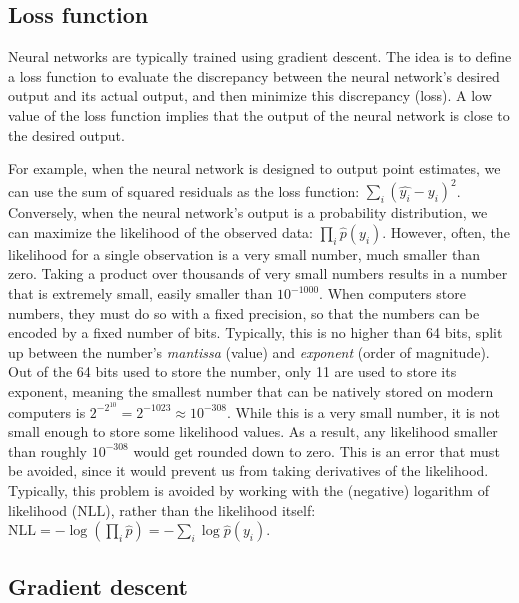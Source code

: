 \documentclass[12pt]{article}
\begin{document}
\subsection{Loss function}
\label{sec_loss_fn}

Neural networks are typically trained using gradient descent. The idea is to define a loss function to evaluate the discrepancy between the neural network's desired output and its actual output, and then minimize this discrepancy (loss). A low value of the loss function implies that the output of the neural network is close to the desired output.

For example, when the neural network is designed to output point estimates, we can use the sum of squared residuals as the loss function: $\sum_i (\hat{y_i} - y_i)^2$. Conversely, when the neural network's output is a probability distribution, we can maximize the likelihood of the observed data: $\prod_i \hat{p}(y_i)$. However, often, the likelihood for a single observation is a very small number, much smaller than zero. Taking a product over thousands of very small numbers results in a number that is extremely small, easily smaller than $10^{-1000}$. When computers store numbers, they must do so with a fixed precision, so that the numbers can be encoded by a fixed number of bits. Typically, this is no higher than 64 bits, split up between the number's \textit{mantissa} (value) and \textit{exponent} (order of magnitude). Out of the 64 bits used to store the number, only 11 are used to store its exponent, meaning the smallest number that can be natively stored on modern computers is $2^{-2^{10}} = 2^{-1023} \approx 10^{-308}$. While this is a very small number, it is not small enough to store some likelihood values. As a result, any likelihood smaller than roughly $10^{-308}$ would get rounded down to zero. This is an error that must be avoided, since it would prevent us from taking derivatives of the likelihood. Typically, this problem is avoided by working with the (negative) logarithm of likelihood ($\textrm{NLL}$), rather than the likelihood itself: $\textrm{NLL} = -\log(\prod_i \hat{p}) = -\sum_i \log\hat{p}(y_i)$.

\subsection{Gradient descent}
\end{document}
